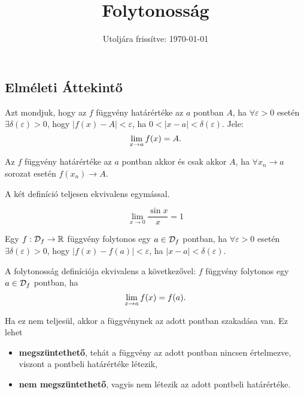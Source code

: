\documentclass[a4paper, 12pt]{scrartcl}
\title{Folytonosság}
\date{Utoljára frissítve: \today}
\begin{document}
\maketitle

\subsection{Elméleti Áttekintő}

\begin{definition}
  Azt mondjuk, hogy az $f$ függvény határértéke az $a$ pontban $A$, ha $\forall
    \varepsilon > 0$ esetén $\exists \delta(\varepsilon) > 0$, hogy $|f(x) - A|
    < \varepsilon$, ha $0 < |x - a| < \delta(\varepsilon)$. Jele:
  \[
    \lim_{x \rightarrow a} f(x) = A
    \text.
  \]
\end{definition}

\begin{definition}
  Az $f$ függvény határértéke az $a$ pontban akkor és csak akkor $A$, ha
  $\forall x_n \rightarrow a$ sorozat esetén $f(x_n) \rightarrow A$.
\end{definition}

\begin{note}
  A két definíció teljesen ekvivalens egymással.
\end{note}

\begin{theorem}
  \[
    \lim_{x \rightarrow 0} \frac{\sin x}{x} = 1
  \]
\end{theorem}

\begin{definition}[Folytonosság]
  Egy $f : \mathcal{D}_f \rightarrow \mathbb{R}$ függvény folytonos egy $a \in
    \mathcal{D}_f$ pontban, ha $\forall \varepsilon > 0$ esetén $\exists \delta(
    \varepsilon) > 0$, hogy $|f(x) - f(a)| < \varepsilon$, ha $|x - a| < \delta(
    \varepsilon)$.
\end{definition}

\begin{statement}
  A folytonosság definíciója ekvivalens a következővel: $f$ függvény folytonos
  egy ${a \in \mathcal{D}_f}$ pontban, ha
  \[
    \lim_{x \to a} f(x) = f(a)
    \text.
  \]
\end{statement}

\begin{note}
  Ha ez nem teljesül, akkor a függvénynek az adott pontban szakadása van. Ez
  lehet
  \begin{itemize}
    \item \textbf{megszüntethető}, tehát a függvény az adott pontban nincsen
          értelmezve, viszont a pontbeli határértéke létezik,
    \item \textbf{nem megszüntethető}, vagyis nem létezik az adott pontbeli
          határértéke.
  \end{itemize}
\end{note}
\end{document}
